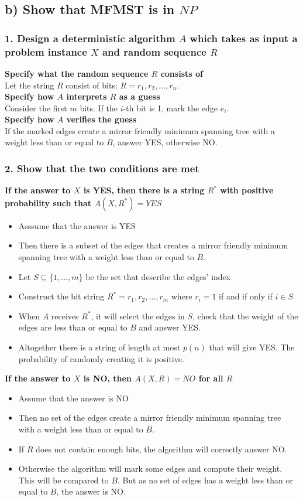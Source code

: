 \documentclass[12pt]{article}
\begin{document}
\subsection*{b) Show that MFMST is in $NP$}
\subsubsection*{1. Design a deterministic algorithm $A$ which takes as input a problem instance $X$ and random sequence $R$}
\textbf{Specify what the random sequence $R$ consists of}\\
Let the string $R$ consist of bits: $R = r_1,r_2,\dots,r_n$.\\[0.25cm]
\textbf{Specify how $A$ interprets $R$ as a guess}\\
Consider the first $m$ bits. If the $i$-th bit is 1, mark the edge $e_i$.\\[0.25cm]
\textbf{Specify how $A$ verifies the guess}\\
If the marked edges create a mirror friendly minimum spanning tree with a weight less than or equal to $B$, answer YES, otherwise NO.
\subsubsection*{2. Show that the two conditions are met}
\textbf{If the answer to $X$ is YES, then there is a string $R^*$ with positive probability such that $A(X, R^*) = YES$}
\begin{itemize}
\item[] Asssume that the answer is YES
\item[] Then there is a subset of the edges that creates a mirror friendly minimum spanning tree with a weight less than or equal to $B$.
\item[] Let $S \subseteq \{1,\dots,m\}$ be the set that describe the edges' index
\item[] Construct the bit string $R^* = r_1,r_2,\dots,r_m$ where $r_i = 1$ if and if only if $i \in S$
\item[] When $A$ receives $R^*$, it will select the edges in $S$, check that the weight of the edges are less than or equal to $B$ and answer YES.
\item[] Altogether there is a string of length at most $p(n)$ that will give YES. The probability of randomly creating it is positive.
\end{itemize}
\textbf{If the answer to $X$ is NO, then $A(X, R) = NO$ for all $R$}
\begin{itemize}
\item[] Assume that the answer is NO
\item[] Then no set of the edges create a mirror friendly minimum spanning tree with a weight less than or equal to $B$.
\item[] If $R$ does not contain enough bits, the algorithm will correctly answer NO.
\item[] Otherwise the algorithm will mark some edges and compute their weight. This will be compared to $B$. But as no set of edges has a weight less than or equal to $B$, the answer is NO.
\end{itemize}
\end{document}
